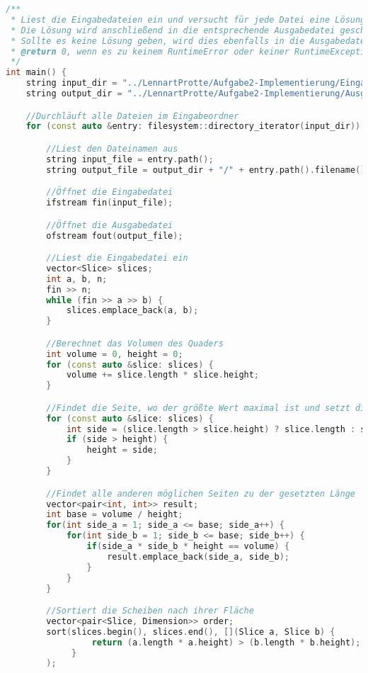 \documentclass[a4paper,10pt,ngerman]{scrartcl}
\begin{document}
    \begin{lstlisting}[frame=single,language=C++,title=Methode main,breaklines=true,label={lst:code_main}]
/**
 * Liest die Eingabedateien ein und versucht für jede Datei eine Lösung entsprechend der Aufgabenstellung zu finden
 * Die Lösung wird anschließend in die entsprechende Ausgabedatei geschrieben
 * Sollte es keine Lösung geben, wird dies ebenfalls in die Ausgabedatei geschrieben
 * @return 0, wenn es zu keinem RuntimeError oder keiner RuntimeException gekommen ist
 */
int main() {
    string input_dir = "../LennartProtte/Aufgabe2-Implementierung/Eingabedateien";
    string output_dir = "../LennartProtte/Aufgabe2-Implementierung/Ausgabedateien";

    //Durchläuft alle Dateien im Eingabeordner
    for (const auto &entry: filesystem::directory_iterator(input_dir)) {

        //Liest den Dateinamen aus
        string input_file = entry.path();
        string output_file = output_dir + "/" + entry.path().filename().string();

        //Öffnet die Eingabedatei
        ifstream fin(input_file);

        //Öffnet die Ausgabedatei
        ofstream fout(output_file);

        //Liest die Eingabedatei ein
        vector<Slice> slices;
        int a, b, n;
        fin >> n;
        while (fin >> a >> b) {
            slices.emplace_back(a, b);
        }

        //Berechnet das Volumen des Quaders
        int volume = 0, height = 0;
        for (const auto &slice: slices) {
            volume += slice.length * slice.height;
        }

        //Findet die Seite, wo der größte Wert maximal ist und setzt die Länge auf diesen Wert
        for (const auto &slice: slices) {
            int side = (slice.length > slice.height) ? slice.length : slice.height;
            if (side > height) {
                height = side;
            }
        }

        //Findet alle anderen möglichen Seiten zu der gesetzten Länge
        vector<pair<int, int>> result;
        int base = volume / height;
        for(int side_a = 1; side_a <= base; side_a++) {
            for(int side_b = 1; side_b <= base; side_b++) {
                if(side_a * side_b * height == volume) {
                    result.emplace_back(side_a, side_b);
                }
            }
        }

        //Sortiert die Scheiben nach ihrer Fläche
        vector<pair<Slice, Dimension>> order;
        sort(slices.begin(), slices.end(), [](Slice a, Slice b) {
                 return (a.length * a.height) > (b.length * b.height);
             }
        );


\end{lstlisting}
\end{document}
